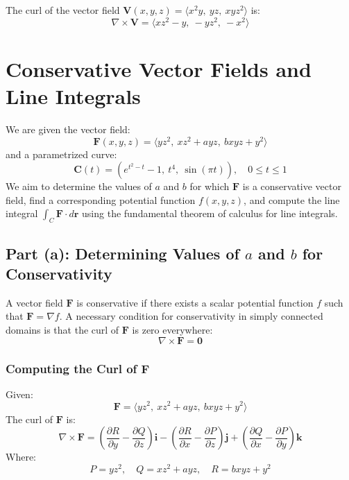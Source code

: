 \documentclass[11pt]{article}
\begin{document}
The curl of the vector field \( \mathbf{V}(x, y, z) = \langle x^2 y, \ yz, \ x y z^2 \rangle \) is:
\[
\boxed{ \nabla \times \mathbf{V} = \langle x z^2 - y,\ - y z^2,\ -x^2 \rangle }
\]




\newpage

\section{Conservative Vector Fields and Line Integrals}

We are given the vector field:
\[
\mathbf{F}(x, y, z) = \langle y z^2, \ x z^2 + a y z, \ b x y z + y^2 \rangle
\]
and a parametrized curve:
\[
\mathbf{C}(t) = \left( e^{t^2 - t} - 1, \ t^4, \ \sin(\pi t) \right), \quad 0 \leq t \leq 1
\]
We aim to determine the values of \( a \) and \( b \) for which \( \mathbf{F} \) is a conservative vector field, find a corresponding potential function \( f(x, y, z) \), and compute the line integral \( \int_{C} \mathbf{F} \cdot d\mathbf{r} \) using the fundamental theorem of calculus for line integrals.

\newpage

\subsection{Part (a): Determining Values of \( a \) and \( b \) for Conservativity}

A vector field \( \mathbf{F} \) is conservative if there exists a scalar potential function \( f \) such that \( \mathbf{F} = \nabla f \). A necessary condition for conservativity in simply connected domains is that the curl of \( \mathbf{F} \) is zero everywhere:
\[
\nabla \times \mathbf{F} = \mathbf{0}
\]

\subsubsection*{Computing the Curl of \( \mathbf{F} \)}

Given:
\[
\mathbf{F} = \langle y z^2, \ x z^2 + a y z, \ b x y z + y^2 \rangle
\]
The curl of \( \mathbf{F} \) is:
\[
\nabla \times \mathbf{F} = \left( \frac{\partial R}{\partial y} - \frac{\partial Q}{\partial z} \right) \mathbf{i} - \left( \frac{\partial R}{\partial x} - \frac{\partial P}{\partial z} \right) \mathbf{j} + \left( \frac{\partial Q}{\partial x} - \frac{\partial P}{\partial y} \right) \mathbf{k}
\]
Where:
\[
P = y z^2, \quad Q = x z^2 + a y z, \quad R = b x y z + y^2
\]
\end{document}
